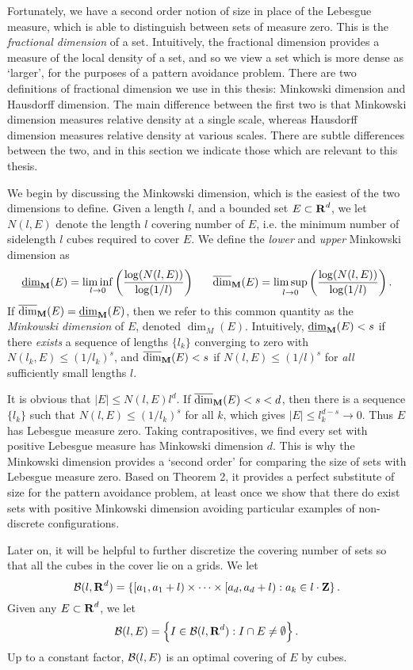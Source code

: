 Fortunately, we have a second order notion of size in place of the Lebesgue measure, which is able to distinguish between sets of measure zero. This is the \emph{fractional dimension} of a set. Intuitively, the fractional dimension provides a measure of the local density of a set, and so we view a set which is more dense as `larger', for the purposes of a pattern avoidance problem. There are two definitions of fractional dimension we use in this thesis: Minkowski dimension and Hausdorff dimension. The main difference between the first two is that Minkowski dimension measures relative density at a single scale, whereas Hausdorff dimension measures relative density at various scales. There are subtle differences between the two, and in this section we indicate those which are relevant to this thesis.

We begin by discussing the Minkowski dimension, which is the easiest of the two dimensions to define. Given a length $l$, and a bounded set $E \subset \operatorname{\mathbf{R}}^d$, we let $N(l,E)$ denote the length $l$ covering number of $E$, i.e. the minimum number of sidelength $l$ cubes required to cover $E$. We define the \emph{lower} and \emph{upper} Minkowski dimension as
%
\[ \operatorname{\underline{\dim}_{\mathbf{M}}}(E) = \liminf_{l \to 0} \left( \frac{\log(N(l,E))}{\log(1/l)} \right)\ \ \ \ \ \operatorname{\overline{\dim}_{\mathbf{M}}}(E) = \limsup_{l \to 0} \left( \frac{\log(N(l,E))}{\log(1/l)} \right). \]
%
If $\operatorname{\overline{\dim}_{\mathbf{M}}}(E) = \operatorname{\underline{\dim}_{\mathbf{M}}}(E)$, then we refer to this common quantity as the \emph{Minkowski dimension} of $E$, denoted $\dim_M(E)$. Intuitively, $\operatorname{\underline{\dim}_{\mathbf{M}}}(E) < s$ if there {\it exists} a sequence of lengths $\{ l_k \}$ converging to zero with $N(l_k,E) \leq (1/l_k)^s$, and $\operatorname{\overline{\dim}_{\mathbf{M}}}(E) < s$ if $N(l,E) \leq (1/l)^s$ for \emph{all} sufficiently small lengths $l$.

It is obvious that $|E| \leq N(l,E) l^d$. If $\operatorname{\overline{\dim}_{\mathbf{M}}}(E) < s < d$, then there is a sequence $\{ l_k \}$ such that $N(l,E) \leq (1/l_k)^s$ for all $k$, which gives $|E| \leq l_k^{d-s} \to 0$. Thus $E$ has Lebesgue measure zero. Taking contrapositives, we find every set with positive Lebesgue measure has Minkowski dimension $d$. This is why the Minkowski dimension provides a `second order' for comparing the size of sets with Lebesgue measure zero. Based on Theorem 2, it provides a perfect substitute of size for the pattern avoidance problem, at least once we show that there do exist sets with positive Minkowski dimension avoiding particular examples of non-discrete configurations.

Later on, it will be helpful to further discretize the covering number of sets so that all the cubes in the cover lie on a grids. We let
%
\[ \operatorname{\mathcal{B}}(l,\operatorname{\mathbf{R}}^d) = \left\{ [a_1,a_1 + l) \times \cdots \times [a_d,a_d + l): a_k \in l \cdot \operatorname{\mathbf{Z}} \right\}. \]
%
Given any $E \subset \operatorname{\mathbf{R}}^d$, we let
%
\[ \operatorname{\mathcal{B}}(l,E) = \left\{ I \in \operatorname{\mathcal{B}}(l,\operatorname{\mathbf{R}}^d): I \cap E \neq \emptyset \right\}. \]
%
Up to a constant factor, $\operatorname{\mathcal{B}}(l,E)$ is an optimal covering of $E$ by cubes.

